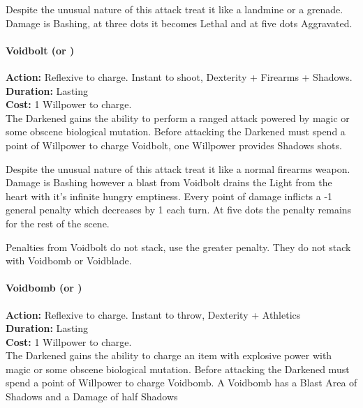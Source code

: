 Despite the unusual nature of this attack treat it like a landmine or a grenade. Damage is Bashing, at three dots it becomes Lethal and at five dots Aggravated.\\

\paragraph*{Voidbolt (\textbullet\textbullet\textbullet or \textbullet\textbullet\textbullet\textbullet\textbullet)}

\noindent \textbf{Action:} Reflexive to charge. Instant to shoot, Dexterity + Firearms + Shadows.\\

\noindent \textbf{Duration:} Lasting \\

\noindent \textbf{Cost:} 1 Willpower to charge.\\

\noindent The Darkened gains the ability to perform a ranged attack powered by magic or some obscene biological mutation. Before attacking the Darkened must spend a point of Willpower to charge Voidbolt, one Willpower provides Shadows shots.

Despite the unusual nature of this attack treat it like a normal firearms weapon. Damage is Bashing however a blast from Voidbolt drains the Light from the heart with it's infinite hungry emptiness. Every point of damage inflicts a -1 general penalty which decreases by 1 each turn. At five dots the penalty remains for the rest of the scene.

Penalties from Voidbolt do not stack, use the greater penalty. They do not stack with Voidbomb or Voidblade.\\

\paragraph*{Voidbomb (\textbullet\textbullet\textbullet or \textbullet\textbullet\textbullet\textbullet\textbullet)}

\noindent \textbf{Action:} Reflexive to charge. Instant to throw, Dexterity + Athletics\\

\noindent \textbf{Duration:} Lasting \\

\noindent \textbf{Cost:} 1 Willpower to charge.\\

\noindent The Darkened gains the ability to charge an item with explosive power with magic or some obscene biological mutation. Before attacking the Darkened must spend a point of Willpower to charge Voidbomb. A Voidbomb has a Blast Area of Shadows and a Damage of half Shadows

